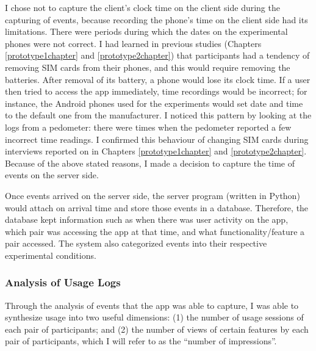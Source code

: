 I chose not to capture the client's clock time on the client side during the capturing of events, because recording the phone's time on the client side had its limitations. There were periods during which the dates on the experimental phones were not correct. I had learned in previous studies (Chapters \ref{prototype1chapter} and \ref{prototype2chapter}) that participants had a tendency of removing SIM cards from their phones, and this would require removing the batteries. After removal of its battery, a phone would lose its clock time. If a user then tried to access the app immediately, time recordings would be incorrect; for instance, the Android phones used for the experiments would set date and time to the default one from the manufacturer. I noticed this pattern by looking at the logs from a pedometer: there were times when the pedometer reported a few incorrect time readings. I confirmed this behaviour of changing SIM cards during interviews reported on in Chapters \ref{prototype1chapter} and \ref{prototype2chapter}. Because of the above stated reasons, I made a decision to capture the time of events on the server side. 

Once events arrived on the server side, the server program (written in Python) would attach on arrival time and store those events in a database. Therefore, the database kept information such as when there was user activity on the app, which pair was accessing the app at that time, and what functionality/feature a pair accessed. The system also categorized events into their respective experimental conditions.  
\subsubsection{Analysis of Usage Logs}\label{log_analysis}
Through the analysis of events that the app was able to capture, I was able to synthesize usage into two useful dimensions: (1) the number of usage sessions of each pair of participants; and (2) the number of views of certain features by each pair of participants, which I will refer to as the ``number of impressions''.

